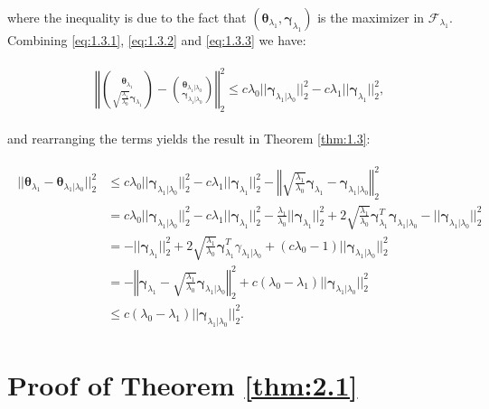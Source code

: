 where the inequality is due to the fact that $(\boldsymbol\theta_{\lambda_1},\boldsymbol\gamma_{\lambda_1})$ is the maximizer in $\mathcal{F}_{\lambda_1}$. Combining \eqref{eq:1.3.1}, \eqref{eq:1.3.2} and \eqref{eq:1.3.3} we have:

\begin{gather}
    \begin{aligned}
        &\left\Vert\binom{\boldsymbol\theta_{\lambda_1}}{\sqrt{\frac{\lambda_1}{\lambda_0}}\boldsymbol\gamma_{\lambda_1}}-\binom{\boldsymbol\theta_{\lambda_1|\lambda_0}}{\boldsymbol\gamma_{\lambda_1|\lambda_0}}\right\Vert_2^2\leq c\lambda_0||\boldsymbol\gamma_{\lambda_1|\lambda_0}||_2^2-c\lambda_1||\boldsymbol\gamma_{\lambda_1}||_2^2,
    \end{aligned}
\end{gather}

and rearranging the terms yields the result in Theorem \ref{thm:1.3}:

\begin{gather}
    \begin{aligned}
        ||\boldsymbol\theta_{\lambda_1}-\boldsymbol\theta_{\lambda_1|\lambda_0}||_2^2&\leq c\lambda_0||\boldsymbol\gamma_{\lambda_1|\lambda_0}||_2^2-c\lambda_1||\boldsymbol\gamma_{\lambda_1}||_2^2-\left\Vert\sqrt{\frac{\lambda_1}{\lambda_0}}\boldsymbol\gamma_{\lambda_1}-\boldsymbol\gamma_{\lambda_1|\lambda_0}\right\Vert_2^2\\
        &=c\lambda_0||\boldsymbol\gamma_{\lambda_1|\lambda_0}||_2^2-c\lambda_1||\boldsymbol\gamma_{\lambda_1}||_2^2-\frac{\lambda_1}{\lambda_0}||\boldsymbol\gamma_{\lambda_1}||_2^2+2\sqrt{\frac{\lambda_1}{\lambda_0}}\boldsymbol\gamma_{\lambda_1}^T\boldsymbol\gamma_{\lambda_1|\lambda_0}-||\boldsymbol\gamma_{\lambda_1|\lambda_0}||_2^2\\
        &=-||\boldsymbol\gamma_{\lambda_1}||_2^2+2\sqrt{\frac{\lambda_1}{\lambda_0}}\boldsymbol\gamma_{\lambda_1}^T\gamma_{\lambda_1|\lambda_0}+(c\lambda_0-1)||\boldsymbol\gamma_{\lambda_1|\lambda_0}||_2^2\\
        &=-\left\Vert\boldsymbol\gamma_{\lambda_1}-\sqrt{\frac{\lambda_1}{\lambda_0}}\boldsymbol\gamma_{\lambda_1|\lambda_0}\right\Vert_2^2+c(\lambda_0-\lambda_1)||\boldsymbol\gamma_{\lambda_1|\lambda_0}||_2^2\\
        &\leq c(\lambda_0-\lambda_1)||\boldsymbol\gamma_{\lambda_1|\lambda_0}||_2^2.
    \end{aligned}
\end{gather}

\section{Proof of Theorem \ref{thm:2.1}}

